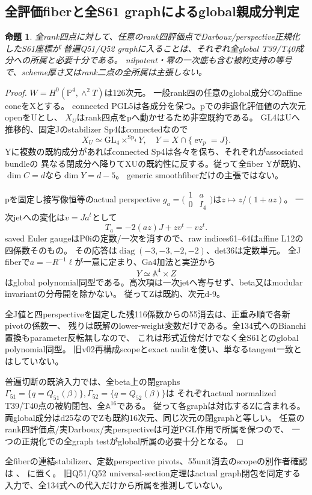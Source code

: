 \documentclass[a4paper,11pt]{ltjsarticle}
\newtheorem{proposition}{命題}[section]
\theoremstyle{definition}
\begin{document}
\subsection{全評価fiberと全S61 graphによるglobal親成分判定}
\begin{proposition}\label{prop:S61-global-evaluation-component-fiber}
全rank四点に対して、任意のrank四評価点でDarboux/perspective正規化したS61座標が
普遍Q51/Q52 graphに入ることは、それぞれ全global T39/T40成分への所属と必要十分である。
nilpotent・零の一次底も含む被約支持の等号で、scheme厚さ又はrank二点の全所属は主張しない。
\end{proposition}
\begin{proof}
$W=H^0(\mathbb P^4,\wedge^2T)$は126次元。
一般rank四の任意のglobal成分Cのaffine coneをXとする。
connected PGL5は各成分を保つ。pでの非退化評価値の六次元openをUとし、
$X_U$はrank四点をpへ動かせるため非空既約である。
GL4はUへ推移的、固定Jのstabilizer Sp4はconnectedなので
\[
 X_U\simeq\mathrm{GL}_4\times^{\mathrm{Sp}_4}Y,\quad
 Y=X\cap\{\operatorname{ev}_p=J\}.
\]
Yに複数の既約成分があればconnected Sp4は各々を保ち、それぞれがassociated bundleの
異なる閉成分へ降りてXUの既約性に反する。従って全fiber Yが既約、$\dim C=d$なら$\dim Y=d-5$。
generic smoothfiberだけの主張ではない。

pを固定し接写像恒等のactual perspective
$g_a=\bigl(\begin{smallmatrix}1&a\\0&I_4\end{smallmatrix}\bigr)$は$z\mapsto z/(1+az)$。
一次jetへの変化は$v=Ja^t$として
\[
 T_a=-2(az)J+zv^t-vz^t.
\]
saved Euler gaugeはP0iの定数/一次を消すので、raw indices61--64はaffine L12の四係数そのもの。
その応答は$\operatorname{diag}(-3,-3,-2,-2)$、det36は定数単元。
全J fiberで$a=-R^{-1}\ell$が一意に定まり、Ga4加法と実逆から
\[
 Y\simeq\mathbb A^4\times Z
\]
はglobal polynomial同型である。高次項は一次jetへ寄与せず、beta又はmodular invariantの分母開を除かない。
従ってZは既約、次元d-9。

全J値と四perspectiveを固定した残116係数からの55消去は、正重み順で各新pivotの係数一、
残りは既解のlower-weight変数だけである。全134式へのBianchi置換もparameter反転無しなので、
これは形式近傍だけでなく全S61とのglobal polynomial同型。
旧v02再構成scopeとexact auditを使い、単なるtangent一致とはしていない。

普遍切断の既済入力では、全beta上の閉graphs
$\Gamma_{51}=\{q=Q_{51}(\beta)\},\Gamma_{52}=\{q=Q_{52}(\beta)\}$は
それぞれactual normalized T39/T40点の被約閉包、全$\mathbb A^{16}$である。
従って各graphは対応するZに含まれる。
両global成分はd25なのでZも既約16次元、同じ次元の閉graphと等しい。
任意のrank四評価点/実Darboux/実perspectiveは可逆PGL作用で所属を保つので、
一つの正規化での全graph testがglobal所属の必要十分となる。
\end{proof}
全fiberの連結stabilizer、定数perspective pivots、55unit消去のscopeの別作者確認は
、
に置く。
旧Q51/Q52 universal-section定理はactual graph閉包を同定する入力で、全134式への代入だけから所属を推測していない。
\end{document}
